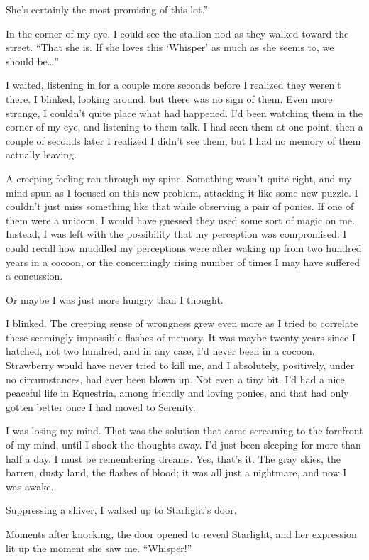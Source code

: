 \leavevmode{}She’s certainly the most promising of this lot.”

In the corner of my eye, I could see the stallion nod as they walked toward the street. “That she is. If she loves this ‘Whisper’ as much as she seems to, we should be…”

I waited, listening in for a couple more seconds before I realized they weren’t there. I blinked, looking around, but there was no sign of them. Even more strange, I couldn’t quite place what had happened. I’d been watching them in the corner of my eye, and listening to them talk. I had seen them at one point, then a couple of seconds later I realized I didn’t see them, but I had no memory of them actually leaving.

A creeping feeling ran through my spine. Something wasn’t quite right, and my mind spun as I focused on this new problem, attacking it like some new puzzle. I couldn’t just miss something like that while observing a pair of ponies. If one of them were a unicorn, I would have guessed they used some sort of magic on me. Instead, I was left with the possibility that my perception was compromised. I could recall how muddled my perceptions were after waking up from two hundred years in a cocoon, or the concerningly rising number of times I may have suffered a concussion.

Or maybe I was just more hungry than I thought.

I blinked. The creeping sense of wrongness grew even more as I tried to correlate these seemingly impossible flashes of memory. It was maybe twenty years since I hatched, not two hundred, and in any case, I’d never been in a cocoon. Strawberry would have never tried to kill me, and I absolutely, positively, under no circumstances, had ever been blown up. Not even a tiny bit. I’d had a nice peaceful life in Equestria, among friendly and loving ponies, and that had only gotten better once I had moved to Serenity.

I was losing my mind. That was the solution that came screaming to the forefront of my mind, until I shook the thoughts away. I’d just been sleeping for more than half a day. I must be remembering dreams. Yes, that’s it. The gray skies, the barren, dusty land, the flashes of blood; it was all just a nightmare, and now I was awake.

Suppressing a shiver, I walked up to Starlight’s door.

Moments after knocking, the door opened to reveal Starlight, and her expression lit up the moment she saw me. “Whisper!”


